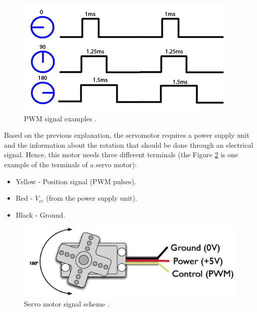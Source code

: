 \begin{figure}[H]
\centering
\includegraphics[scale=0.5]{figures/signal_servo.jpg}
\caption{PWM signal examples \cite{lirtex}.}
\label{signal_servo}
\end{figure}

Based on the previous explanation, the servomotor requires a power supply unit and the information about the rotation that should be done through an electrical signal. Hence, this motor needs three different terminals (the Figure \ref{cable_servo} is one example of the terminals of a servo motor):
\begin{itemize}  
        \item Yellow - Position signal (PWM pulses).
        \item Red - $V_{cc}$ (from the power supply unit). 
        \item Black - Ground.
\end{itemize}

\begin{figure}[H]
\centering
\includegraphics[scale=0.7]{figures/cable_servo.jpg}
\caption{Servo motor signal scheme \cite{wire}.}
\label{cable_servo}
\end{figure}

